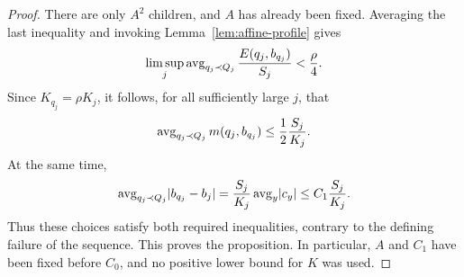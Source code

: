 \begin{proof}
There are only \(A^2\) children, and \(A\) has already been fixed.
Averaging the last inequality and invoking
Lemma~\ref{lem:affine-profile} gives
\[
 \limsup_j\operatorname{avg}_{q_j\prec Q_j}
       \frac{E(q_j,b_{q_j})}{S_j}<\frac\rho4.
\]
Since \(K_{q_j}=\rho K_j\), it follows, for all sufficiently large
\(j\), that
\[
 \operatorname{avg}_{q_j\prec Q_j}m(q_j,b_{q_j})
 \le\frac12\frac{S_j}{K_j}.
\]
At the same time,
\[
 \operatorname{avg}_{q_j\prec Q_j}\lvert b_{q_j}-b_j\rvert
 =\frac{S_j}{K_j}\operatorname{avg}_y\lvert c_y\rvert
 \le C_1\frac{S_j}{K_j}.
\]
Thus these choices satisfy both required inequalities, contrary
to the defining failure of the sequence.  This proves the
proposition.  In particular, \(A\) and \(C_1\) have been fixed
before \(C_0\), and no positive lower bound for \(K\) was used.
\end{proof}
